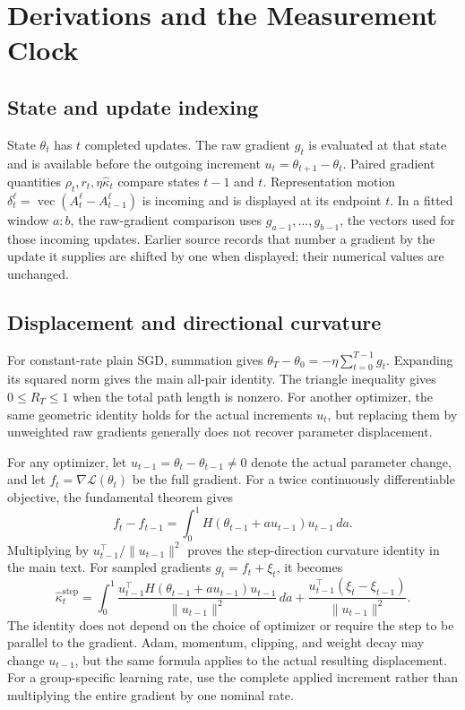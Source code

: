 \section{Derivations and the Measurement Clock}

\subsection{State and update indexing}
State $\theta_t$ has $t$ completed updates. The raw gradient $g_t$ is evaluated at that state and is available before the outgoing increment $u_t=\theta_{t+1}-\theta_t$. Paired gradient quantities $\rho_t,r_t,\eta\widehat\kappa_t$ compare states $t-1$ and $t$. Representation motion $\delta_t^\ell=\operatorname{vec}(A_t^\ell-A_{t-1}^\ell)$ is incoming and is displayed at its endpoint $t$. In a fitted window $a{:}b$, the raw-gradient comparison uses $g_{a-1},\ldots,g_{b-1}$, the vectors used for those incoming updates. Earlier source records that number a gradient by the update it supplies are shifted by one when displayed; their numerical values are unchanged.

\subsection{Displacement and directional curvature}
For constant-rate plain SGD, summation gives $\theta_T-\theta_0=-\eta\sum_{t=0}^{T-1}g_t$. Expanding its squared norm gives the main all-pair identity. The triangle inequality gives $0\leq R_T\leq1$ when the total path length is nonzero. For another optimizer, the same geometric identity holds for the actual increments $u_t$, but replacing them by unweighted raw gradients generally does not recover parameter displacement.

For any optimizer, let $u_{t-1}=\theta_t-\theta_{t-1}\ne0$ denote the actual parameter change, and let $f_t=\nabla\mathcal L(\theta_t)$ be the full gradient. For a twice continuously differentiable objective, the fundamental theorem gives
\begin{equation}
 f_t-f_{t-1}=\int_0^1H(\theta_{t-1}+a u_{t-1})u_{t-1}\,da.
\end{equation}
Multiplying by $u_{t-1}^{\top}/\|u_{t-1}\|^2$ proves the step-direction curvature identity in the main text. For sampled gradients $g_t=f_t+\xi_t$, it becomes
\begin{equation}
 \widehat\kappa_t^{\mathrm{step}}
 =\int_0^1\frac{u_{t-1}^{\top}H(\theta_{t-1}+a u_{t-1})u_{t-1}}{\|u_{t-1}\|^2}\,da
 +\frac{u_{t-1}^{\top}(\xi_t-\xi_{t-1})}{\|u_{t-1}\|^2}.
 \label{eq:s-general-curvature}
\end{equation}
The identity does not depend on the choice of optimizer or require the step to be parallel to the gradient. Adam, momentum, clipping, and weight decay may change $u_{t-1}$, but the same formula applies to the actual resulting displacement. For a group-specific learning rate, use the complete applied increment rather than multiplying the entire gradient by one nominal rate.

